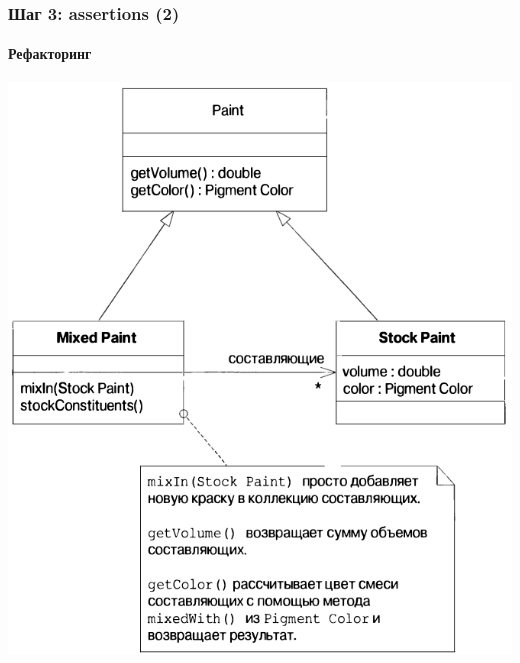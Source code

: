 \documentclass[xetex,mathserif,serif]{beamer}
\begin{document}
	\begin{frame}
		\frametitle{Шаг 3: assertions (2)}
		\framesubtitle{Рефакторинг}
		\begin{center}
			\includegraphics[height=0.8\textheight]{stockPaints.png}
		\end{center}
	\end{frame}
\end{document}
